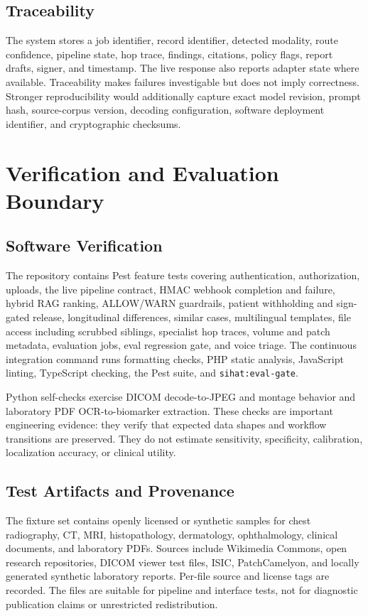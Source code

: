 \documentclass[conference]{IEEEtran}
\begin{document}
\subsection{Traceability}

The system stores a job identifier, record identifier, detected modality, route confidence, pipeline state, hop trace, findings, citations, policy flags, report drafts, signer, and timestamp. The live response also reports adapter state where available. Traceability makes failures investigable but does not imply correctness. Stronger reproducibility would additionally capture exact model revision, prompt hash, source-corpus version, decoding configuration, software deployment identifier, and cryptographic checksums.

\section{Verification and Evaluation Boundary}

\subsection{Software Verification}

The repository contains Pest feature tests covering authentication, authorization, uploads, the live pipeline contract, HMAC webhook completion and failure, hybrid RAG ranking, ALLOW/WARN guardrails, patient withholding and sign-gated release, longitudinal differences, similar cases, multilingual templates, file access including scrubbed siblings, specialist hop traces, volume and patch metadata, evaluation jobs, eval regression gate, and voice triage. The continuous integration command runs formatting checks, PHP static analysis, JavaScript linting, TypeScript checking, the Pest suite, and \texttt{sihat:eval-gate}.

Python self-checks exercise DICOM decode-to-JPEG and montage behavior and laboratory PDF OCR-to-biomarker extraction. These checks are important engineering evidence: they verify that expected data shapes and workflow transitions are preserved. They do not estimate sensitivity, specificity, calibration, localization accuracy, or clinical utility.

\subsection{Test Artifacts and Provenance}

The fixture set contains openly licensed or synthetic samples for chest radiography, CT, MRI, histopathology, dermatology, ophthalmology, clinical documents, and laboratory PDFs. Sources include Wikimedia Commons, open research repositories, DICOM viewer test files, ISIC, PatchCamelyon, and locally generated synthetic laboratory reports. Per-file source and license tags are recorded. The files are suitable for pipeline and interface tests, not for diagnostic publication claims or unrestricted redistribution.
\end{document}
